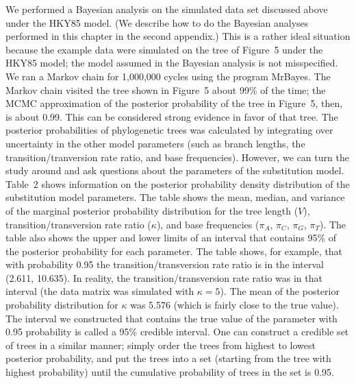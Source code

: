 \documentclass{svmult}
\begin{document}
We performed a Bayesian analysis on the simulated data set discussed above under the HKY85 model.
(We describe how to do the Bayesian analyses performed in this chapter in the second appendix.)
This is a rather ideal situation because the example data were simulated on the tree of Figure~5
under the HKY85 model; the model assumed in the Bayesian analysis is not misspecified.  We ran a
Markov chain for 1,000,000 cycles using the program MrBayes. The Markov chain visited the tree
shown in Figure~5 about 99\% of the time; the MCMC approximation of the posterior probability of
the tree in Figure~5, then, is about 0.99. This can be considered strong evidence in favor of that
tree. The posterior probabilities of phylogenetic trees was calculated by integrating over
uncertainty in the other model parameters (such as branch lengths, the transition/tranversion rate
ratio, and base frequencies). However, we can turn the study around and ask questions about the
parameters of the substitution model. Table~2 shows information on the posterior probability
density distribution of the substitution model parameters.  The table shows the mean, median, and
variance of the marginal posterior probability distribution for the tree length ($V$),
transition/transversion rate ratio ($\kappa$), and base frequencies ($\pi_A$, $\pi_C$, $\pi_G$,
$\pi_T$). The table also shows the upper and lower limits of an interval that contains 95\% of the
posterior probability for each parameter. The table shows, for example, that with probability 0.95
the transition/transversion rate ratio is in the interval (2.611, 10.635). In reality, the
transition/transversion rate ratio was in that interval (the data matrix was simulated with $\kappa
= 5$). The mean of the posterior probability distribution for $\kappa$ was 5.576 (which is fairly
close to the true value). The interval we constructed that contains the true value of the parameter
with 0.95 probability is called a 95\% credible interval. One can construct a credible set of trees
in a similar manner; simply order the trees from highest to lowest posterior probability, and put
the trees into a set (starting from the tree with highest probability) until the cumulative
probability of trees in the set is 0.95. 
\end{document}
